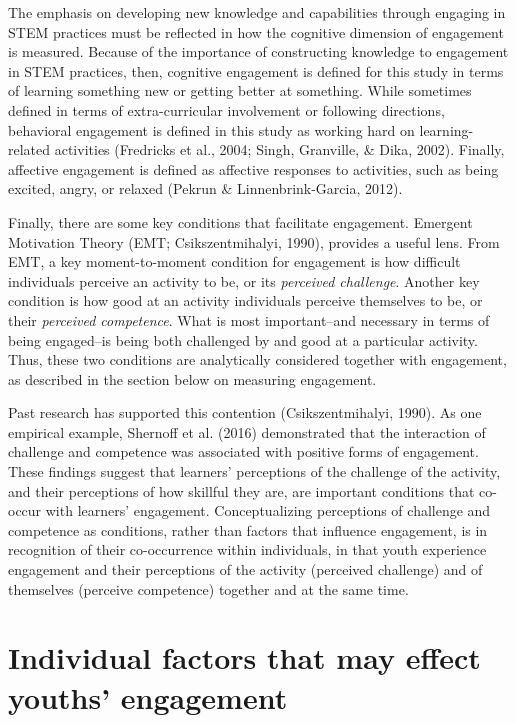 \documentclass[]{book}
\theoremstyle{definition}
\theoremstyle{definition}
\theoremstyle{definition}
\theoremstyle{remark}
\begin{document}
The emphasis on developing new knowledge and capabilities through
engaging in STEM practices must be reflected in how the cognitive
dimension of engagement is measured. Because of the importance of
constructing knowledge to engagement in STEM practices, then, cognitive
engagement is defined for this study in terms of learning something new
or getting better at something. While sometimes defined in terms of
extra-curricular involvement or following directions, behavioral
engagement is defined in this study as working hard on learning-related
activities (Fredricks et al., 2004; Singh, Granville, \& Dika, 2002).
Finally, affective engagement is defined as affective responses to
activities, such as being excited, angry, or relaxed (Pekrun \&
Linnenbrink-Garcia, 2012).

Finally, there are some key conditions that facilitate engagement.
Emergent Motivation Theory (EMT; Csikszentmihalyi, 1990), provides a
useful lens. From EMT, a key moment-to-moment condition for engagement
is how difficult individuals perceive an activity to be, or its
\emph{perceived challenge}. Another key condition is how good at an
activity individuals perceive themselves to be, or their \emph{perceived
competence}. What is most important--and necessary in terms of being
engaged--is being both challenged by and good at a particular activity.
Thus, these two conditions are analytically considered together with
engagement, as described in the section below on measuring engagement.

Past research has supported this contention (Csikszentmihalyi, 1990). As
one empirical example, Shernoff et al. (2016) demonstrated that the
interaction of challenge and competence was associated with positive
forms of engagement. These findings suggest that learners' perceptions
of the challenge of the activity, and their perceptions of how skillful
they are, are important conditions that co-occur with learners'
engagement. Conceptualizing perceptions of challenge and competence as
conditions, rather than factors that influence engagement, is in
recognition of their co-occurrence within individuals, in that youth
experience engagement and their perceptions of the activity (perceived
challenge) and of themselves (perceive competence) together and at the
same time.

\section{Individual factors that may effect youths'
engagement}\label{individual-factors-that-may-effect-youths-engagement}
\end{document}
